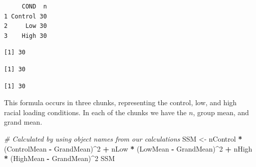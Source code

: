 \documentclass[
  11pt,
]{book}
\newenvironment{Shaded}{\begin{snugshade}}{\end{snugshade}}
\newcommand{\CommentTok}[1]{\textcolor[rgb]{0.37,0.37,0.37}{\textit{#1}}}
\newcommand{\DecValTok}[1]{\textcolor[rgb]{0.06,0.06,0.06}{#1}}
\newcommand{\NormalTok}[1]{#1}
\newcommand{\OtherTok}[1]{\textcolor[rgb]{0.37,0.37,0.37}{#1}}
\newcommand{\SpecialCharTok}[1]{\textcolor[rgb]{0.43,0.43,0.43}{\textbf{#1}}}
\begin{document}
\begin{verbatim}
     COND  n
1 Control 30
2     Low 30
3    High 30
\end{verbatim}

\begin{Shaded}
\end{Shaded}

\begin{verbatim}
[1] 30
\end{verbatim}

\begin{Shaded}
\end{Shaded}

\begin{verbatim}
[1] 30
\end{verbatim}

\begin{Shaded}
\end{Shaded}

\begin{verbatim}
[1] 30
\end{verbatim}

This formula occurs in three chunks, representing the control, low, and high racial loading conditions. In each of the chunks we have the \(n\), group mean, and grand mean.

\begin{Shaded}
\begin{Highlighting}[]
\CommentTok{\# Calculated by using object names from our calculations}
\NormalTok{SSM }\OtherTok{\textless{}{-}}\NormalTok{ nControl }\SpecialCharTok{*}\NormalTok{ (ControlMean }\SpecialCharTok{{-}}\NormalTok{ GrandMean)}\SpecialCharTok{\^{}}\DecValTok{2} \SpecialCharTok{+}\NormalTok{ nLow }\SpecialCharTok{*}\NormalTok{ (LowMean }\SpecialCharTok{{-}}\NormalTok{ GrandMean)}\SpecialCharTok{\^{}}\DecValTok{2} \SpecialCharTok{+}
\NormalTok{    nHigh }\SpecialCharTok{*}\NormalTok{ (HighMean }\SpecialCharTok{{-}}\NormalTok{ GrandMean)}\SpecialCharTok{\^{}}\DecValTok{2}
\NormalTok{SSM}
\end{Highlighting}
\end{Shaded}
\end{document}
